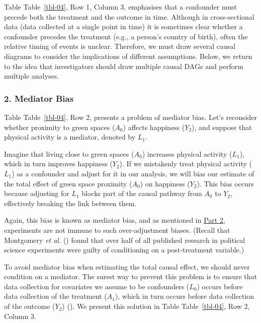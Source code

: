 \documentclass[
  singlecolumn]{article}
\begin{document}
Table Table~\ref{tbl-04}, Row 1, Column 3, emphasises that a confounder
must precede both the treatment and the outcome in time. Although in
cross-sectional data (data collected at a single point in time) it is
sometimes clear whether a confounder precedes the treatment (e.g., a
person's country of birth), often the relative timing of events is
unclear. Therefore, we must draw several causal diagrams to consider the
implications of different assumptions. Below, we return to the idea that
investigators should draw multiple causal DAGs and perform multiple
analyses.

\subsubsection{2. Mediator Bias}\label{mediator-bias}

Table Table~\ref{tbl-04}, Row 2, presents a problem of mediator bias.
Let's reconsider whether proximity to green spaces (\(A_0\)) affects
happiness (\(Y_2\)), and suppose that physical activity is a mediator,
denoted by \(L_1\).

Imagine that living close to green spaces (\(A_0\)) increases physical
activity (\(L_1\)), which in turn improves happiness (\(Y_2\)). If we
mistakenly treat physical activity (\(L_1\)) as a confounder and adjust
for it in our analysis, we will bias our estimate of the total effect of
green space proximity (\(A_0\)) on happiness (\(Y_2\)). This bias occurs
because adjusting for \(L_1\) blocks part of the causal pathway from
\(A_0\) to \(Y_2\), effectively breaking the link between them.

Again, this bias is known as mediator bias, and as mentioned in
\hyperref[section-part2]{Part 2}, experiments are not immune to such
over-adjustment biases. (Recall that Montgomery \emph{et al.}
() found that over half of all
published research in political science experiments were guilty of
conditioning on a post-treatment variable.)

To avoid mediator bias when estimating the total causal effect, we
should never condition on a mediator. The surest way to prevent this
problem is to ensure that data collection for covariates we assume to be
confounders (\(L_0\)) occurs before data collection of the treatment
(\(A_1\)), which in turn occurs before data collection of the outcome
(\(Y_2\)) (). We present this solution in Table Table~\ref{tbl-04}, Row 2,
Column 3.
\end{document}
